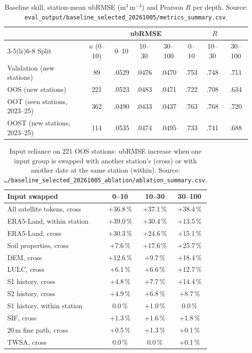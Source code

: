 \documentclass[11pt,a4paper]{article}
\begin{document}
\begin{table}[h]
\centering\small
\caption{Baseline skill, station-mean ubRMSE (m$^3$\,m$^{-3}$) and Pearson $R$ per depth.
Source: \texttt{eval\_output/baseline\_selected\_20261005/metrics\_summary.csv}.}
\begin{tabular}{l c ccc ccc}
\toprule
 & & \multicolumn{3}{c}{ubRMSE} & \multicolumn{3}{c}{$R$} \\
\cmidrule(lr){3-5}\cmidrule(lr){6-8}
Split & $n$ (0--10) & 0--10 & 10--30 & 30--100 & 0--10 & 10--30 & 30--100 \\
\midrule
Validation (new stations) & 89  & .0529 & .0476 & .0470 & .753 & .748 & .711 \\
OOS (new stations)        & 221 & .0523 & .0483 & .0471 & .722 & .708 & .634 \\
OOT (seen stations, 2023--25) & 362 & .0490 & .0433 & .0437 & .763 & .768 & .720 \\
OOST (new stations, 2023--25) & 114 & .0535 & .0474 & .0495 & .733 & .741 & .688 \\
\bottomrule
\end{tabular}
\end{table}

\begin{table}[h]
\centering\small
\caption{Input reliance on 221 OOS stations: ubRMSE increase when one input group is swapped
with another station's (cross) or with another date at the same station (within). Source:
\texttt{\dots/baseline\_selected\_20261005\_ablation/ablation\_summary.csv}.}
\begin{tabular}{l ccc}
\toprule
Input swapped & 0--10 & 10--30 & 30--100 \\
\midrule
All satellite tokens, cross & +36.8\,\% & +37.1\,\% & +38.4\,\% \\
ERA5-Land, within station   & +39.0\,\% & +30.4\,\% & +13.5\,\% \\
ERA5-Land, cross            & +30.3\,\% & +24.6\,\% & +15.1\,\% \\
Soil properties, cross      & +7.6\,\%  & +17.6\,\% & +25.7\,\% \\
DEM, cross                  & +12.6\,\% & +9.7\,\%  & +18.4\,\% \\
LULC, cross                 & +6.1\,\%  & +6.6\,\%  & +12.7\,\% \\
S1 history, cross           & +4.8\,\%  & +7.7\,\%  & +14.4\,\% \\
S2 history, cross           & +4.9\,\%  & +6.8\,\%  & +8.7\,\% \\
S1 history, within station  & 0.0\,\%   & +1.0\,\%  & 0.0\,\% \\
SIF, cross                  & +1.3\,\%  & +1.6\,\%  & +1.8\,\% \\
20\,m fine path, cross      & +0.5\,\%  & +1.3\,\%  & +0.1\,\% \\
TWSA, cross                 & 0.0\,\%   & 0.0\,\%   & +0.1\,\% \\
\bottomrule
\end{tabular}
\end{table}
\end{document}
